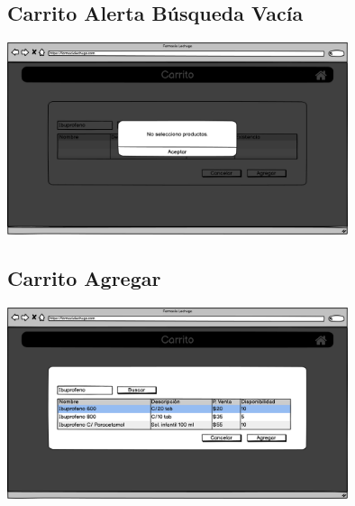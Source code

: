 \begin{flushleft}
	\subsection{Carrito Alerta Búsqueda Vacía} \label{UI: carrito alerta busqueda}
	\begin{center}
		\includegraphics[width=10cm]{pantallas/images/5carritoalertavacia.png}\\	
		 	
	\end{center}
	\subsection{Carrito Agregar} \label{UI: carrito agregar}
	\begin{center}
		\includegraphics[width=10cm]{pantallas/images/6carritoagregar.png}\\	
		 	
	\end{center}

\end{flushleft}
